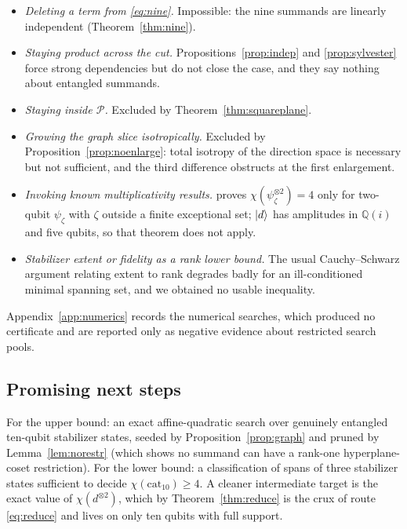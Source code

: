 \documentclass[11pt]{article}
\theoremstyle{plain}
\theoremstyle{definition}
\newcommand{\Q}{\mathbb{Q}}
\newcommand{\cat}{\mathrm{cat}}
\begin{document}
\begin{itemize}[leftmargin=*]
\item \emph{Deleting a term from \eqref{eq:nine}.} Impossible: the nine summands are
linearly independent (Theorem~\ref{thm:nine}).
\item \emph{Staying product across the cut.} Propositions~\ref{prop:indep} and
\ref{prop:sylvester} force strong dependencies but do not close the case, and they say
nothing about entangled summands.
\item \emph{Staying inside $\mathcal P$.} Excluded by Theorem~\ref{thm:squareplane}.
\item \emph{Growing the graph slice isotropically.} Excluded by
Proposition~\ref{prop:noenlarge}: total isotropy of the direction space is necessary but
not sufficient, and the third difference obstructs at the first enlargement.
\item \emph{Invoking known multiplicativity results.} \cite[Thm.~4.1]{LovitzSteffan2022}
proves $\chi(\psi_\zeta^{\otimes2})=4$ only for two-qubit $\psi_\zeta$ with $\zeta$
outside a finite exceptional set; $\ket d$ has amplitudes in $\Q(i)$ and five qubits, so
that theorem does not apply.
\item \emph{Stabilizer extent or fidelity as a rank lower bound.} The usual
Cauchy--Schwarz argument relating extent to rank degrades badly for an ill-conditioned
minimal spanning set, and we obtained no usable inequality.
\end{itemize}

Appendix~\ref{app:numerics} records the numerical searches, which produced no
certificate and are reported only as negative evidence about restricted search pools.

\subsection{Promising next steps}

For the upper bound: an exact affine-quadratic search over genuinely entangled
ten-qubit stabilizer states, seeded by Proposition~\ref{prop:graph} and pruned by
Lemma~\ref{lem:norestr} (which shows no summand can have a rank-one hyperplane-coset
restriction). For the lower bound: a classification of spans of three stabilizer states
sufficient to decide $\chi(\cat_{10})\ge4$. A cleaner intermediate target is the exact
value of $\chi(d^{\otimes2})$, which by Theorem~\ref{thm:reduce} is the crux of
route \eqref{eq:reduce} and lives on only ten qubits with full support.
\end{document}

